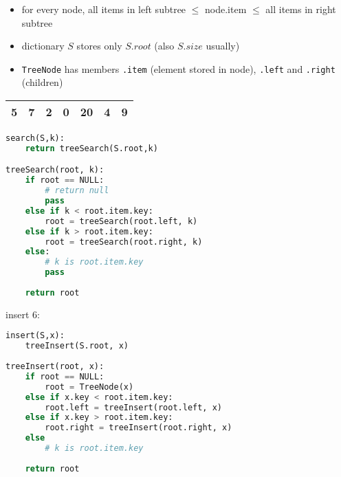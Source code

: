 \begin{itemize}
	\item for every node, all items in left subtree $\leq$ node.item $\leq$ all items in right subtree
	\item dictionary $S$ stores only $S.root$ (also $S.size$ usually)
	\item \texttt{TreeNode} has members \texttt{.item} (element stored in node), \texttt{.left} and \texttt{.right} (children)
\end{itemize} 

\begin{tabular}{| l | l | l | l | l | l | l |}
	\hline 5 & 7 & 2 & 0 & 20 & 4 & 9 \\ \hline
\end{tabular}

\begin{center}
\end{center}

\begin{lstlisting}[language=Python]
search(S,k):
	return treeSearch(S.root,k)

treeSearch(root, k):
	if root == NULL:
		# return null
		pass
	else if k < root.item.key:
		root = treeSearch(root.left, k)
	else if k > root.item.key:
		root = treeSearch(root.right, k)
	else:
		# k is root.item.key
		pass
	
	return root	
\end{lstlisting}

\newpage
\noindent insert 6:

\begin{center}
\end{center}

\begin{lstlisting}[language=Python]
insert(S,x):
	treeInsert(S.root, x)
	
treeInsert(root, x):
	if root == NULL:
		root = TreeNode(x)
	else if x.key < root.item.key:
		root.left = treeInsert(root.left, x)
	else if x.key > root.item.key:
		root.right = treeInsert(root.right, x)
	else
		# k is root.item.key
		
	return root
\end{lstlisting}

